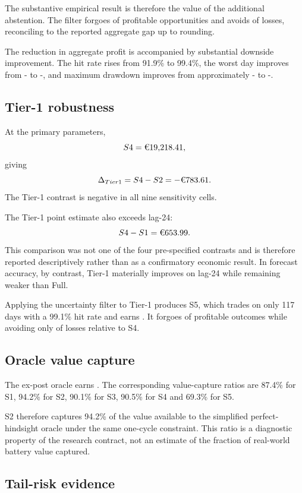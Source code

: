 The substantive empirical result is therefore the value of the additional abstention. The filter forgoes  of profitable opportunities and avoids  of losses, reconciling to the reported aggregate gap up to rounding.

The reduction in aggregate profit is accompanied by substantial downside improvement. The hit rate rises from 91.9\% to 99.4\%, the worst day improves from - to -, and maximum drawdown improves from approximately - to -.

\subsection{Tier-1 robustness}

At the primary parameters,
\[
S4=\EUR{19,218.41},
\]
giving
\[
\Delta_{Tier1}=S4-S2=-\EUR{783.61}.
\]
The Tier-1 contrast is negative in all nine sensitivity cells.

The Tier-1 point estimate also exceeds lag-24:
\[
S4-S1=\EUR{653.99}.
\]
This comparison was not one of the four pre-specified contrasts and is therefore reported descriptively rather than as a confirmatory economic result. In forecast accuracy, by contrast, Tier-1 materially improves on lag-24 while remaining weaker than Full.

Applying the uncertainty filter to Tier-1 produces S5, which trades on only 117 days with a 99.1\% hit rate and earns . It forgoes  of profitable outcomes while avoiding only  of losses relative to S4.

\subsection{Oracle value capture}

The ex-post oracle earns . The corresponding value-capture ratios are 87.4\% for S1, 94.2\% for S2, 90.1\% for S3, 90.5\% for S4 and 69.3\% for S5.

S2 therefore captures 94.2\% of the value available to the simplified perfect-hindsight oracle under the same one-cycle constraint. This ratio is a diagnostic property of the research contract, not an estimate of the fraction of real-world battery value captured.

\subsection{Tail-risk evidence}


